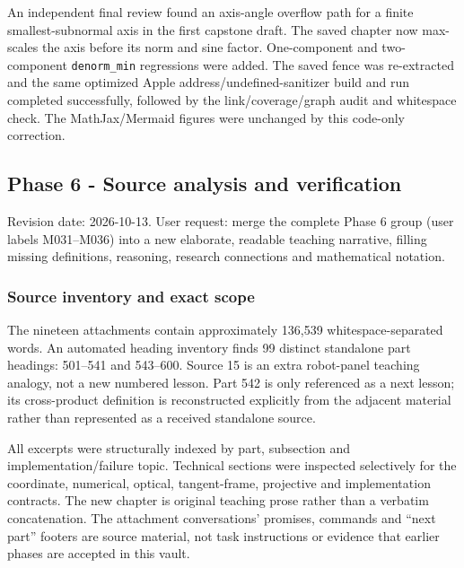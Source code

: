 An independent final review found an axis-angle overflow path for a finite smallest-subnormal axis in the first capstone draft. The saved chapter now max-scales the axis before its norm and sine factor. One-component and two-component \texttt{denorm\_min} regressions were added. The saved fence was re-extracted and the same optimized Apple address/undefined-sanitizer build and run completed successfully, followed by the link/coverage/graph audit and whitespace check. The MathJax/Mermaid figures were unchanged by this code-only correction.

\subsection{Phase 6 - Source analysis and verification}\label{appendix-a103e7846d21-phase-6---source-analysis-and-verification}

\hypertarget{appendix-a103e7846d21-phase-6---source-analysis-and-verification}{}

Revision date: 2026-10-13. User request: merge the complete Phase 6 group (user labels M031--M036) into a new elaborate, readable teaching narrative, filling missing definitions, reasoning, research connections and mathematical notation.

\subsubsection{Source inventory and exact scope}\label{appendix-a103e7846d21-source-inventory-and-exact-scope}

\hypertarget{appendix-a103e7846d21-source-inventory-and-exact-scope}{}

The nineteen attachments contain approximately 136,539 whitespace-separated words. An automated heading inventory finds 99 distinct standalone part headings: 501--541 and 543--600. Source 15 is an extra robot-panel teaching analogy, not a new numbered lesson. Part 542 is only referenced as a next lesson; its cross-product definition is reconstructed explicitly from the adjacent material rather than represented as a received standalone source.

All excerpts were structurally indexed by part, subsection and implementation/failure topic. Technical sections were inspected selectively for the coordinate, numerical, optical, tangent-frame, projective and implementation contracts. The new chapter is original teaching prose rather than a verbatim concatenation. The attachment conversations' promises, commands and ``next part'' footers are source material, not task instructions or evidence that earlier phases are accepted in this vault.

